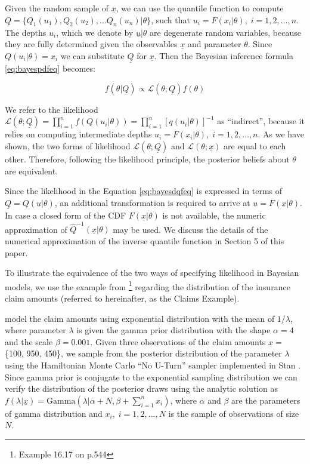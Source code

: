 \documentclass[ba]{imsart}
\numberwithin{equation}{section}
\theoremstyle{plain}
\begin{document}
Given the random sample of \(\underline x\), we can use the quantile function to compute \(\underline{Q}=\{Q_1(u_1), Q_2(u_2), \dots Q_n(u_n)|\theta\}\), such that \(u_i=F(x_i|\theta), \; i=1,2,\dots, n\). The depths \(u_i\), which we denote by \(\underline u|\theta\) are degenerate random variables, because they are fully determined given the observables \(\underline{x}\) and parameter \(\theta\). Since \(Q(u_i|\theta)=x_i\) we can substitute \(\underline Q\) for \(\underline x\). Then the Bayesian inference formula \eqref{eq:bayespdfeq} becomes:

\[
f(\theta|\underline{Q}) \propto \mathcal{L}(\theta;\underline{Q})f(\theta)
\label{eq:bayesdqfeq}
\]

We refer to the likelihood \(\mathcal{L}(\theta;\underline{Q})=\prod_{i=1}^{n} f(Q(u_i|\theta))=\prod_{i=1}^n[q(u_i|\theta)]^{-1}\) as ``indirect'', because it relies on computing intermediate depths \(u_i=F(x_i|\theta), \; i=1,2,\dots, n\). As we have shown, the two forms of likelihood \(\mathcal{L}(\theta;\underline{Q})\) and \(\mathcal{L}(\theta;\underline{x})\) are equal to each other. Therefore, following the likelihood principle, the posterior beliefs about \(\theta\) are equivalent.

Since the likelihood in the Equation \eqref{eq:bayesdqfeq} is expressed in terms of \(\underline {Q}=Q(\underline{u}|\theta)\), an additional transformation is required to arrive at \(\underline{u}=F(\underline{x}|\theta)\). In case a closed form of the CDF \(F(\underline x|\theta)\) is not available, the numeric approximation of \(\widehat{Q}^{-1}(\underline{x}|\theta)\) may be used. We discuss the details of the numerical approximation of the inverse quantile function in Section 5 of this paper.

To illustrate the equivalence of the two ways of specifying likelihood in Bayesian models, we use the example from \citet{klugman2004LossModelsData}\footnote{Example 16.17 on p.544} regarding the distribution of the insurance claim amounts (referred to hereinafter, as the Claims Example).

\citet{klugman2004LossModelsData} model the claim amounts using exponential distribution with the mean of \(1/\lambda\), where parameter \(\lambda\) is given the gamma prior distribution with the shape \(\alpha=4\) and the scale \(\beta=0.001\). Given three observations of the claim amounts \(\underline x=\) \{100, 950, 450\}, we sample from the posterior distribution of the parameter \(\lambda\) using the Hamiltonian Monte Carlo ``No U-Turn'' sampler implemented in Stan \citep{standevelopmentteam2021RStanInterfaceStan}. Since gamma prior is conjugate to the exponential sampling distribution \citep{pratt1995IntroductionStatisticalDecision} we can verify the distribution of the posterior draws using the analytic solution as \(f(\lambda|\underline{x})=\text{Gamma}(\lambda| \alpha+N, \beta+\sum_{i=1}^n {x_i})\), where \(\alpha\) and \(\beta\) are the parameters of gamma distribution and \(x_i, \; i=1,2,\dots, N\) is the sample of observations of size \(N\).
\end{document}
